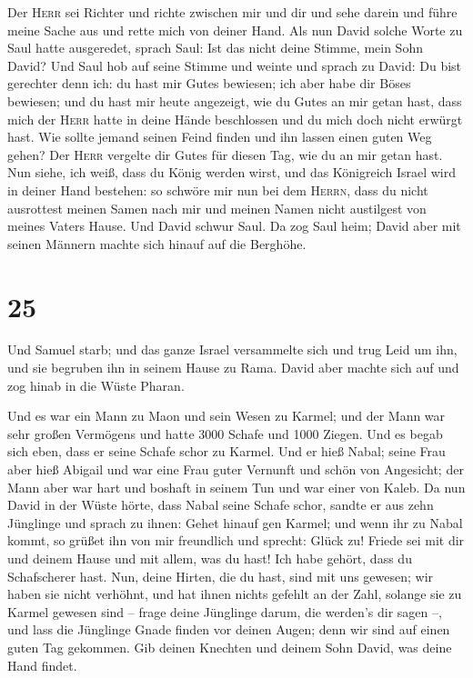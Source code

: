  Der \textsc{Herr} sei Richter und richte zwischen mir
und dir und sehe darein und führe meine Sache aus und rette mich von
deiner Hand.  Als nun David solche Worte zu Saul hatte
ausgeredet, sprach Saul: Ist das nicht deine Stimme, mein Sohn David?
Und Saul hob auf seine Stimme und weinte  und sprach zu
David: Du bist gerechter denn ich: du hast mir Gutes bewiesen; ich aber
habe dir Böses bewiesen;  und du hast mir heute
angezeigt, wie du Gutes an mir getan hast, dass mich der \textsc{Herr}
hatte in deine Hände beschlossen und du mich doch nicht erwürgt hast.
 Wie sollte jemand seinen Feind finden und ihn lassen
einen guten Weg gehen? Der \textsc{Herr} vergelte dir Gutes für diesen
Tag, wie du an mir getan hast.  Nun siehe, ich weiß, dass
du König werden wirst, und das Königreich Israel wird in deiner Hand
bestehen:  so schwöre mir nun bei dem \textsc{Herrn},
dass du nicht ausrottest meinen Samen nach mir und meinen Namen nicht
austilgest von meines Vaters Hause.  Und David schwur
Saul. Da zog Saul heim; David aber mit seinen Männern machte sich hinauf
auf die Berghöhe.

\hypertarget{section-24}{%
\section{25}\label{section-24}}

 Und Samuel starb; und das ganze Israel versammelte sich
und trug Leid um ihn, und sie begruben ihn in seinem Hause zu Rama.
David aber machte sich auf und zog hinab in die Wüste Pharan.

 Und es war ein Mann zu Maon und sein Wesen zu Karmel; und
der Mann war sehr großen Vermögens und hatte 3000 Schafe und 1000
Ziegen. Und es begab sich eben, dass er seine Schafe schor zu Karmel.
 Und er hieß Nabal; seine Frau aber hieß Abigail und war
eine Frau guter Vernunft und schön von Angesicht; der Mann aber war hart
und boshaft in seinem Tun und war einer von Kaleb.  Da nun
David in der Wüste hörte, dass Nabal seine Schafe schor, 
sandte er aus zehn Jünglinge und sprach zu ihnen: Gehet hinauf gen
Karmel; und wenn ihr zu Nabal kommt, so grüßet ihn von mir freundlich
 und sprecht: Glück zu! Friede sei mit dir und deinem
Hause und mit allem, was du hast!  Ich habe gehört, dass
du Schafscherer hast. Nun, deine Hirten, die du hast, sind mit uns
gewesen; wir haben sie nicht verhöhnt, und hat ihnen nichts gefehlt an
der Zahl, solange sie zu Karmel gewesen sind --  frage
deine Jünglinge darum, die werden's dir sagen --, und lass die Jünglinge
Gnade finden vor deinen Augen; denn wir sind auf einen guten Tag
gekommen. Gib deinen Knechten und deinem Sohn David, was deine Hand
findet.

